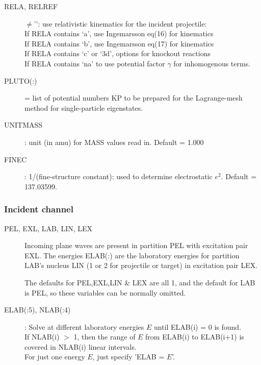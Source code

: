 \documentclass[11pt]{article}
\newcommand{\upq}{\textsf{'}}
\begin{document}
\begin{description}
\item[RELA, RELREF]
$\neq$\upq \upq: use relativistic kinematics for the incident projectile:\\
If RELA contains `a', use Ingemarsson eq(16) for kinematics\\
If RELA contains `b', use Ingemarsson eq(17) for kinematics\\
If RELA contains `c' or `3d', options for knockout reactions\\
If RELA contains `na' to use potential factor $\gamma$  for inhomogenous terms.


\item[PLUTO(:)]
 =  list of potential numbers KP to be prepared for the Lagrange-mesh method for single-particle eigenstates. 

\item[UNITMASS] : unit (in amu) for MASS values read in.
Default = 1.000

\item[FINEC]: 1/(fine-structure constant): used to determine electrostatic $e^2$.
Default = 137.03599.

\end{description}

\subsubsection{Incident channel}
\begin{description}
\item[PEL, EXL, LAB, LIN, LEX]
Incoming plane waves are present in partition PEL with excitation
pair EXL.  The energies ELAB(:) are the laboratory energies for
partition LAB's nucleus LIN (1 or 2 for projectile or target)
in excitation pair LEX.

The defaults for PEL,EXL,LIN \& LEX are all 1, and the default
for LAB is PEL, so these variables can be normally omitted.

\item[ELAB(:5), NLAB(:4)] :
Solve at different laboratory energies $E$ until ELAB(i) = 0 is found.\\
 If NLAB(i) $>$ 1, then the range of $E$ from ELAB(i) to ELAB(i+1) is covered in NLAB(i) linear intervals.\\
 For just one energy $E$, just specify 'ELAB = $E$'.

\end{description}
\end{document}
